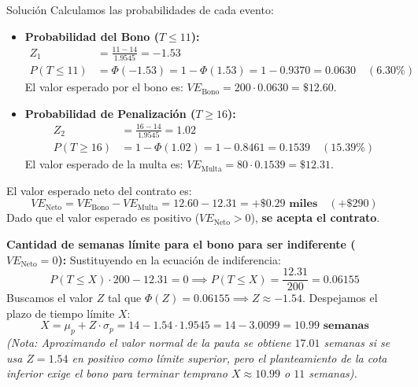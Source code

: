 \documentclass[11pt, a4paper]{article}
\begin{document}
\begin{ejercicio}{Solución}
  Calculamos las probabilidades de cada evento:
  \begin{itemize}
    \item \textbf{Probabilidad del Bono ($T \le 11$):}
      \begin{align*}
        Z_1 &= \frac{11 - 14}{1.9545} = -1.53 \\
        P(T \le 11) &= \Phi(-1.53) = 1 - \Phi(1.53) = 1 - 0.9370 = \mathbf{0.0630} \quad (6.30\%)
      \end{align*}
      El valor esperado por el bono es: $VE_{\text{Bono}} = 200 \cdot 0.0630 = \$12.60$.
    
    \item \textbf{Probabilidad de Penalización ($T \ge 16$):}
      \begin{align*}
        Z_2 &= \frac{16 - 14}{1.9545} = 1.02 \\
        P(T \ge 16) &= 1 - \Phi(1.02) = 1 - 0.8461 = \mathbf{0.1539} \quad (15.39\%)
      \end{align*}
      El valor esperado de la multa es: $VE_{\text{Multa}} = 80 \cdot 0.1539 = \$12.31$.
  \end{itemize}

  El valor esperado neto del contrato es:
  \begin{equation*}
    VE_{\text{Neto}} = VE_{\text{Bono}} - VE_{\text{Multa}} = 12.60 - 12.31 = \mathbf{+\$0.29 \text{ miles}} \quad (+\$290)
  \end{equation*}
  Dado que el valor esperado es positivo ($VE_{\text{Neto}} > 0$), \textbf{se acepta el contrato}.

  \textbf{Cantidad de semanas límite para el bono para ser indiferente ($VE_{\text{Neto}} = 0$):}
  Sustituyendo en la ecuación de indiferencia:
  \begin{equation*}
    P(T \le X) \cdot 200 - 12.31 = 0 \implies P(T \le X) = \frac{12.31}{200} = 0.06155
  \end{equation*}
  Buscamos el valor $Z$ tal que $\Phi(Z) = 0.06155 \implies Z \approx -1.54$.
  Despejamos el plazo de tiempo límite $X$:
  \begin{equation*}
    X = \mu_p + Z \cdot \sigma_p = 14 - 1.54 \cdot 1.9545 = 14 - 3.0099 = \mathbf{10.99 \text{ semanas}}
  \end{equation*}
  \textit{(Nota: Aproximando el valor normal de la pauta se obtiene $17.01$ semanas si se usa $Z=1.54$ en positivo como límite superior, pero el planteamiento de la cota inferior exige el bono para terminar temprano $X \approx 10.99$ o $11$ semanas).}


\end{ejercicio}
\end{document}
